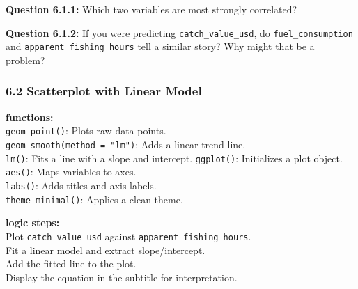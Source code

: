 \documentclass[
]{article}
\begin{document}
\textbf{Question 6.1.1:} Which two variables are most strongly
correlated?

\textbf{Question 6.1.2:} If you were predicting
\texttt{catch\_value\_usd}, do \texttt{fuel\_consumption} and
\texttt{apparent\_fishing\_hours} tell a similar story? Why might that
be a problem?

\hypertarget{scatterplot-with-linear-model}{%
\subsubsection{6.2 Scatterplot with Linear
Model}\label{scatterplot-with-linear-model}}

\textbf{functions:}\\
\texttt{geom\_point()}: Plots raw data points.\\
\texttt{geom\_smooth(method\ =\ "lm")}: Adds a linear trend line.\\
\texttt{lm()}: Fits a line with a slope and intercept.
\texttt{ggplot()}: Initializes a plot object.\\
\texttt{aes()}: Maps variables to axes.\\
\texttt{labs()}: Adds titles and axis labels.\\
\texttt{theme\_minimal()}: Applies a clean theme.

\textbf{logic steps:}\\
Plot \texttt{catch\_value\_usd} against
\texttt{apparent\_fishing\_hours}.\\
Fit a linear model and extract slope/intercept.\\
Add the fitted line to the plot.\\
Display the equation in the subtitle for interpretation.
\end{document}
